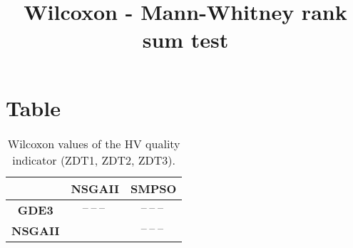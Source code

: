 \documentclass{article}
\title{Wilcoxon - Mann-Whitney rank sum test}
\author{}
\begin{document}
\maketitle
\section{Table}
\begin{table}[!htp]
  \caption{Wilcoxon values of the HV quality indicator (ZDT1, ZDT2, ZDT3).}
  \label{table:HV}
  \centering
  \begin{scriptsize}
  \begin{tabular}{c|cc}
      & \textbf{NSGAII} & \textbf{SMPSO} \\\hline
      \textbf{GDE3} & $\text{--}\ \text{--}\ \text{--}\  $ & $ \text{--}\ \text{--}\ \text{--}\ $ \\
      \textbf{NSGAII} & $ $ & $ \text{--}\ \text{--}\ \text{--}\ $ \\
  \end{tabular}
  \end{scriptsize}
\end{table}
\end{document}
